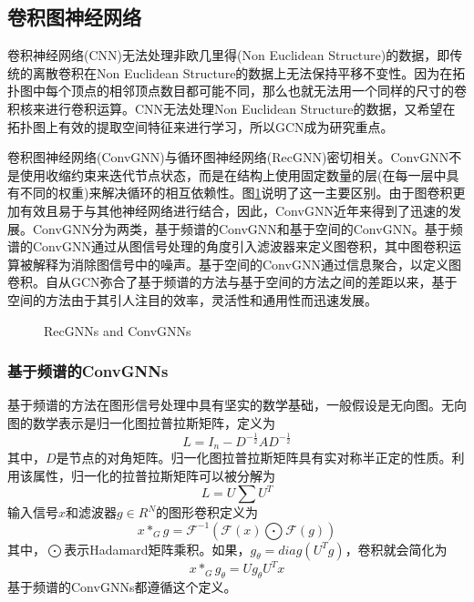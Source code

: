 \subsection{卷积图神经网络}
卷积神经网络(CNN)无法处理非欧几里得(Non Euclidean Structure)的数据，即传统的离散卷积在Non Euclidean Structure的数据上无法保持平移不变性。因为在拓扑图中每个顶点的相邻顶点数目都可能不同，那么也就无法用一个同样的尺寸的卷积核来进行卷积运算。CNN无法处理Non Euclidean Structure的数据，又希望在拓扑图上有效的提取空间特征来进行学习，所以GCN成为研究重点。

卷积图神经网络(ConvGNN)与循环图神经网络(RecGNN)密切相关。ConvGNN不是使用收缩约束来迭代节点状态，而是在结构上使用固定数量的层(在每一层中具有不同的权重)来解决循环的相互依赖性。图\ref{fig:RGNN_CGNN}说明了这一主要区别。由于图卷积更加有效且易于与其他神经网络进行结合，因此，ConvGNN近年来得到了迅速的发展。ConvGNN分为两类，基于频谱的ConvGNN和基于空间的ConvGNN。基于频谱的ConvGNN通过从图信号处理的角度引入滤波器来定义图卷积，其中图卷积运算被解释为消除图信号中的噪声。基于空间的ConvGNN通过信息聚合，以定义图卷积。自从GCN弥合了基于频谱的方法与基于空间的方法之间的差距以来，基于空间的方法由于其引人注目的效率，灵活性和通用性而迅速发展。

\begin{figure}[htbp]
	\centering 

	\caption{RecGNNs and ConvGNNs}
	\label{fig:RGNN_CGNN} 
\end{figure}	

\subsubsection{基于频谱的ConvGNNs}

基于频谱的方法在图形信号处理中具有坚实的数学基础，一般假设是无向图。无向图的数学表示是归一化图拉普拉斯矩阵，定义为
\[L=I_n-D^{-\frac{1}{2}}AD^{-\frac{1}{2}}\]
其中，$D$是节点的对角矩阵。归一化图拉普拉斯矩阵具有实对称半正定的性质。利用该属性，归一化的拉普拉斯矩阵可以被分解为
\[L=U\sum U^T\]
输入信号$x$和滤波器$g\in R^N$的图形卷积定义为
\[
x*_Gg=\mathcal{F}^{-1}(\mathcal{F}(x)\bigodot \mathcal{F}(g))
\]
其中，$\bigodot$表示Hadamard矩阵乘积。如果，$g_{\theta}=diag(U^Tg)$，卷积就会简化为
\[
x*_Gg_{\theta}=Ug_{\theta}U^Tx
\]
基于频谱的ConvGNNs都遵循这个定义。

